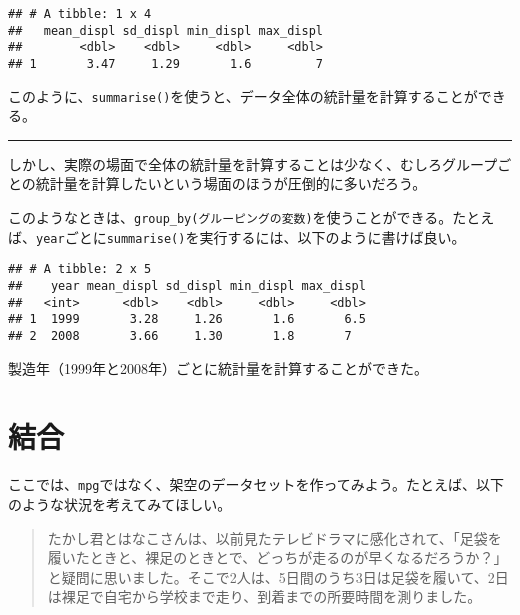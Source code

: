 \documentclass[]{book}
\newenvironment{Shaded}{\begin{snugshade}}{\end{snugshade}}
\newcommand{\KeywordTok}[1]{\textcolor[rgb]{0.13,0.29,0.53}{\textbf{#1}}}
\newcommand{\DataTypeTok}[1]{\textcolor[rgb]{0.13,0.29,0.53}{#1}}
\newcommand{\StringTok}[1]{\textcolor[rgb]{0.31,0.60,0.02}{#1}}
\newcommand{\OperatorTok}[1]{\textcolor[rgb]{0.81,0.36,0.00}{\textbf{#1}}}
\newcommand{\NormalTok}[1]{#1}
\begin{document}
\begin{verbatim}
## # A tibble: 1 x 4
##   mean_displ sd_displ min_displ max_displ
##        <dbl>    <dbl>     <dbl>     <dbl>
## 1       3.47     1.29       1.6         7
\end{verbatim}

このように、\texttt{summarise()}を使うと、データ全体の統計量を計算することができる。

\begin{center}\rule{0.5\linewidth}{\linethickness}\end{center}

しかし、実際の場面で全体の統計量を計算することは少なく、むしろグループごとの統計量を計算したいという場面のほうが圧倒的に多いだろう。

このようなときは、\texttt{group\_by(グルーピングの変数)}を使うことができる。たとえば、\texttt{year}ごとに\texttt{summarise()}を実行するには、以下のように書けば良い。

\begin{Shaded}
\end{Shaded}

\begin{verbatim}
## # A tibble: 2 x 5
##    year mean_displ sd_displ min_displ max_displ
##   <int>      <dbl>    <dbl>     <dbl>     <dbl>
## 1  1999       3.28     1.26       1.6       6.5
## 2  2008       3.66     1.30       1.8       7
\end{verbatim}

製造年（1999年と2008年）ごとに統計量を計算することができた。

\section{結合}

ここでは、\texttt{mpg}ではなく、架空のデータセットを作ってみよう。たとえば、以下のような状況を考えてみてほしい。

\begin{quote}
たかし君とはなこさんは、以前見たテレビドラマに感化されて、「足袋を履いたときと、裸足のときとで、どっちが走るのが早くなるだろうか？」と疑問に思いました。そこで2人は、5日間のうち3日は足袋を履いて、2日は裸足で自宅から学校まで走り、到着までの所要時間を測りました。
\end{quote}
\end{document}
